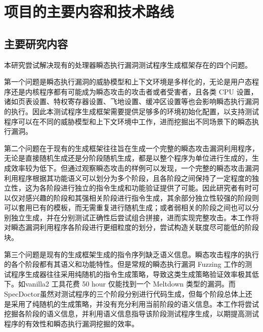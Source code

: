 \section{项目的主要内容和技术路线}

\subsection{主要研究内容}

本研究尝试解决现有的处理器瞬态执行漏洞测试程序生成框架存在的四个问题。\par

第一个问题是瞬态执行漏洞的威胁模型和上下文环境是多样化的\cite{kocher2020spectre}\cite{horn2018meltdown}\cite{ragab2021rage}\cite{van2006cacheout}，无论是用户态程序还是内核程序都有可能成为瞬态攻击的攻击者或者受害者，且各类 CPU 设置，诸如页表设置\cite{horn2018meltdown}、特权寄存器设置、飞地设置\cite{van2018foreshadow}、缓冲区设置\cite{moghimi2020medusa}等也会影响瞬态执行漏洞的执行。因此本测试程序生成框架需要提供足够多的环境初始化配置，以支持测试程序可以在不同的威胁模型和上下文环境中工作，进而挖掘出不同场景下的瞬态执行漏洞。\par

第二个问题在于现有的生成框架往往旨在生成一个完整的瞬态攻击漏洞利用程序，无论是直接随机生成还是分阶段随机生成，都是以整个程序为单位进行生成的，生成效率较为低下。但通过观察瞬态攻击的样例\cite{riscv-test}可以发现，一个完整的瞬态攻击漏洞利用程序根据其功能语义可以划分为多个阶段，且各阶段之间保持了一定程度的独立性，这为各阶段进行独立的指令生成和功能验证提供了可能。因此研究者有时可以仅对感兴趣的阶段和其强相关阶段进行指令生成，其余部分独立性较强的阶段则可以套用已有的模板，而无需重复进行随机生成；或者弱相关的阶段之间也可以分别独立生成，并在分别测试正确性后尝试组合拼接，进而实现完整攻击。本工作将对瞬态漏洞利用程序各阶段进行更细粒度的划分，尝试构造关联度尽可能低的阶段块。\par

第三个问题是现有的生成框架生成的指令序列缺乏语义信息。瞬态攻击程序的执行的各个阶段都有其语义和功能特性。但是常规的瞬态执行漏洞 Fuzzing 工作的测试程序生成器往往采用纯随机的指令生成策略\cite{oleksenko2022revizor}\cite{hur2022specdoctor}，导致这类生成策略验证效率极其低下。如vanilla2 工具花费 50 hour 仅能找到一个 Meltdown 类型的漏洞\cite{hur2022specdoctor}。而SpecDoctor\cite{hur2022specdoctor}虽然对测试程序的三个阶段分别进行代码生成，但每个阶段总体上还是采用了纯随机的生成策略，并没有充分利用当前阶段的语义信息。本工作将尝试挖掘各阶段的语义信息，并利用语义信息指导该阶段测试程序生成，以期提高测试程序的有效性和瞬态执行漏洞挖掘的效率。\par


